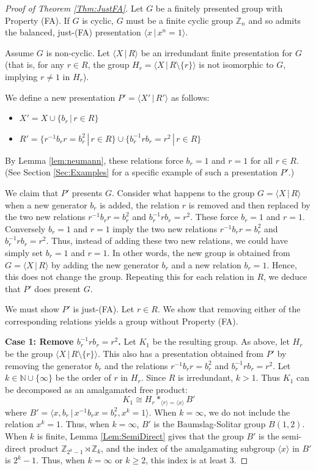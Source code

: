 \documentclass[11pt,oneside]{amsart}
\begin{document}
\begin{proof}[Proof of Theorem \ref{Thm:JustFA}]
Let $G$ be a finitely presented group with Property (FA). If $G$ is cyclic, $G$ must be a finite cyclic group $\mathbb{Z}_n$ and so admits the balanced, just-(FA) presentation $\langle x \, | \, x^n = 1 \rangle$.

Assume $G$ is non-cyclic. Let $\langle X \, | \, R \rangle$ be an irredundant finite presentation for $G$ (that is, for any $r \in R$, the group $H_r = \langle X \, | \, R \setminus \{r\} \rangle$ is not isomorphic to $G$, implying $r \neq 1$ in $H_r$). 

We define a new presentation $P' = \langle X' \, | \, R' \rangle$ as follows:
\begin{itemize}
    \item $X' = X \cup \{b_r \, | \, r \in R\}$
    \item $R' = \{r^{-1} b_r r = b_r^2 \, | \, r \in R\} \cup \{b_r^{-1} r b_r = r^2 \, | \, r \in R\}$
\end{itemize}
By Lemma \ref{lem:neumann}, these relations force $b_r = 1$ and $r = 1$ for all $r \in R$. (See Section \ref{Sec:Examples} for a specific example of such a presentation $P'$.)

We claim that $P'$ presents $G$. Consider what happens to the group $G = \langle X \, | \, R \rangle$ when a new generator $b_r$ is added, the relation $r$ is removed and then replaced by 
the two new relations $r^{-1} b_r r = b_r^2$ and $b_r^{-1} r b_r = r^2$. These force $b_r = 1$ and $r = 1$. Conversely $b_r = 1$ and $r = 1$ imply the two new relations 
$r^{-1} b_r r = b_r^2$ and $b_r^{-1} r b_r = r^2$. Thus, instead of adding these two new relations, we could have simply set $b_r = 1$ and $r = 1$. In other words, the new group is obtained from $G = \langle X \, | \, R \rangle$ by adding the new generator $b_r$ and a new relation $b_r = 1$. Hence, this does not change the group. Repeating this for each relation in $R$, we deduce that $P'$ does present $G$.

We must show $P'$ is just-(FA). Let $r \in R$. We show that removing either of the corresponding relations yields a group without Property (FA).

\textbf{Case 1: Remove $b_{r}^{-1} r b_{r} = r^2$.}
Let $K_1$ be the resulting group. As above, let $H_r$ be the group $\langle X \, | \, R \setminus \{ r \} \rangle$. This also has a presentation obtained from $P'$ by removing the generator $b_r$ and the relations  $r^{-1} b_{r} r = b_{r}^2$ and $b_r^{-1} r b_r = r^2$. Let $k \in \mathbb{N} \cup \{ \infty \}$ be the order of $r$ in $H_r$. Since $R$ is irredundant, $k > 1$. Thus $K_1$ can be decomposed as an amalgamated free product:
\[ K_1 \cong H_{r} *_{\langle r \rangle = \langle x \rangle} B' \]
where $B' = \langle x, b_{r} \, | \, x^{-1} b_{r} x = b_{r}^2, x^k = 1 \rangle$. When $k = \infty$, we do not include the relation $x^k = 1$. Thus, when $k = \infty$, $B'$ is the Baumslag-Solitar group $B(1,2)$. When $k$ is finite,
Lemma \ref{Lem:SemiDirect} gives that the group $B'$ is the semi-direct product $\mathbb{Z}_{2^k-1} \rtimes \mathbb{Z}_k$, and the index of the amalgamating subgroup $\langle x \rangle$ in $B'$ is $2^k - 1$. Thus, when $k = \infty$ or $k \ge 2$, this index is at least $3$.


\end{proof}
\end{document}
